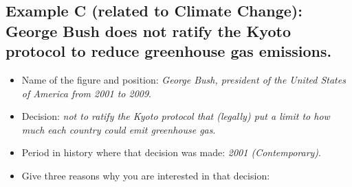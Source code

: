 \documentclass[12pt]{article}
\begin{document}
\subsection*{Example C (related to Climate Change): George Bush does not ratify the Kyoto protocol to reduce greenhouse gas emissions.}

\begin{Form}
\begin{itemize}
    \item Name of the figure and position: \textit{George Bush, president of the United States of America from 2001 to 2009}.
    \item Decision: \textit{not to ratify the Kyoto protocol that (legally) put a limit to how much each country could emit greenhouse gas}.
    \item Period in history where that decision was made: \textit{2001 (Contemporary)}.
    \item Give three reasons why you are interested in that decision:\\[0.2cm]
\TextField[name=reasonstatcher,width=\linewidth,height=2cm,multiline=true, bordercolor={0 0 0}]{}
\end{itemize}
\end{Form}
\end{document}
